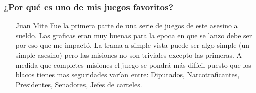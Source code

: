 \subsubsection{¿Por qué es uno de mis juegos favoritos?}
\begin{itemize}
\item[Juan Mite]  Fue la primera parte de una serie de juegos de este asesino a sueldo. Las graficas eran muy buenas para la epoca en que se lanzo debe ser por eso que me impactó.  La trama a simple vista puede ser algo simple (un simple asesino) pero las misiones no son triviales excepto las primeras.  A medida que completes misiones el juego se pondrá más difícil puesto que los blacos tienes mas seguridades varían entre: Diputados, Narcotraficantes, Presidentes, Senadores, Jefes de carteles. 
\end{itemize}
